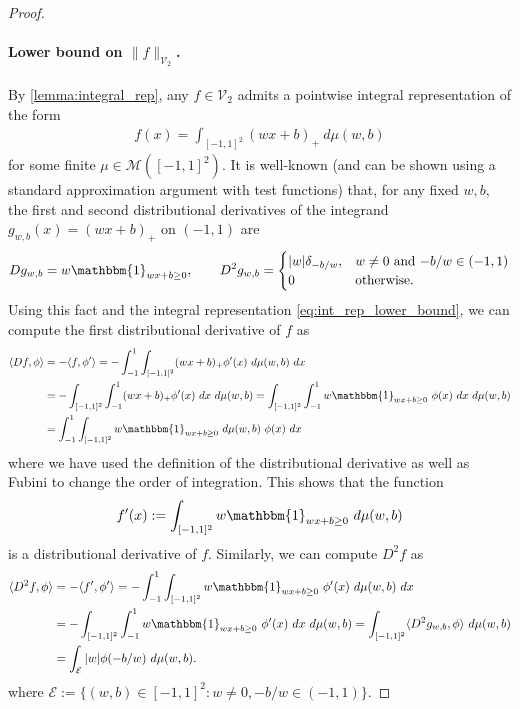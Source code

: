 \documentclass{article}
\def\cE{{\mathcal{E}}}
\def\cM{{\mathcal{M}}}
\def\cV{{\mathcal{V}}}
\begin{document}
\begin{appendices}
\begin{proof}
    \paragraph{Lower bound on $\| f \|_{\cV_2}$.}  By \cref{lemma:integral_rep}, any $f \in \cV_2$ admits a pointwise integral representation of the form
\begin{align} \label{eq:int_rep_lower_bound}
    f(x) = \int_{[-1,1]^2} (wx+b)_+ \ d \mu(w,b)
\end{align}
for some finite $\mu \in \cM([-1,1]^2)$. It is well-known (and can be shown using a standard approximation argument with test functions) that, for any fixed $w,b$, the first and second distributional derivatives of the integrand $g_{w,b}(x) = (wx+b)_+$ on $(-1,1)$ are
\begin{align}
    D g_{w,b} = w \mathbbm{1}_{wx+b \geq 0},\qquad D^2 g_{w,b} = \begin{cases}
        |w| \delta_{-b/w}, &\textrm{$w \neq 0$ and $-b/w \in (-1,1)$} \\
        0 &\textrm{otherwise}.
    \end{cases} 
\end{align}
Using this fact and the integral representation \eqref{eq:int_rep_lower_bound}, we can compute the first distributional derivative of $f$ as
\begin{align}
    \langle Df, \phi \rangle &= - \langle f, \phi' \rangle = - \int_{-1}^1 \int_{[-1,1]^2} (wx+b)_+ \phi'(x)  \ d \mu(w,b) \ dx \\
    &=  - \int_{[-1,1]^2} \int_{-1}^1 (wx+b)_+ \phi'(x) \ dx \ d \mu(w,b) = \int_{[-1,1]^2} \int_{-1}^1 w \mathbbm{1}_{wx+b \geq 0} \  \phi(x) \ dx \ d \mu(w,b) \\
    &=  \int_{-1}^1 \int_{[-1,1]^2} w \mathbbm{1}_{wx+b \geq 0} \ d \mu(w,b) \  \phi(x) \ dx 
\end{align}
where we have used the definition of the distributional derivative as well as Fubini to change the order of integration. This shows that the function
\begin{align} \label{eq:dist_deriv_f}
    f'(x) := \int_{[-1,1]^2} w \mathbbm{1}_{wx+b \geq 0} \ d \mu(w,b)
\end{align}
is a distributional derivative of $f$. Similarly, we can compute $D^2 f$ as
\begin{align}
    \langle D^2 f, \phi \rangle &= - \langle f' , \phi' \rangle = - \int_{-1}^1 \int_{[-1,1]^2} w \mathbbm{1}_{wx+b \geq 0} \ \phi'(x) \ d \mu(w,b) \ dx \\
    &= - \int_{[-1,1]^2} \int_{-1}^1  w \mathbbm{1}_{wx+b \geq 0} \ \phi'(x) \ dx  \ d \mu(w,b) = \int_{[-1,1]^2} \langle D^2 g_{w,b}, \phi \rangle \ d \mu(w,b) \\
    &= \int_{\cE} |w| \phi(-b/w) \ d \mu(w,b).
\end{align} 
where $\cE := \{ (w,b) \in [-1,1]^2: w \neq 0, -b/w \in (-1,1) \}$. 


\end{proof}
\end{appendices}
\end{document}
